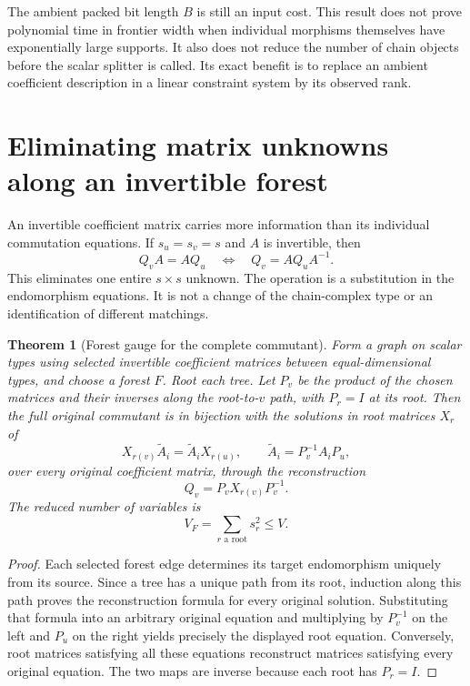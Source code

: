 \documentclass[11pt]{article}
\newtheorem{theorem}{Theorem}[section]
\theoremstyle{definition}
\begin{document}
The ambient packed bit length $B$ is still an input cost. This result
does not prove polynomial time in frontier width when individual
morphisms themselves have exponentially large supports. It also does
not reduce the number of chain objects before the scalar splitter is
called. Its exact benefit is to replace an ambient coefficient
description in a linear constraint system by its observed rank.

\section{Eliminating matrix unknowns along an invertible forest}
\label{sec:forest}

An invertible coefficient matrix carries more information than its
individual commutation equations. If $s_u=s_v=s$ and $A$ is invertible,
then
\[
                       Q_vA=AQ_u
       \quad\Longleftrightarrow\quad Q_v=AQ_uA^{-1}.
\]
This eliminates one entire $s\times s$ unknown. The operation is a
substitution in the endomorphism equations. It is not a change of
the chain-complex type or an identification of different matchings.

\begin{theorem}[Forest gauge for the complete commutant]
\label{thm:forest}
Form a graph on scalar types using selected invertible coefficient
matrices between equal-dimensional types, and choose a forest $F$.
Root each tree. Let $P_v$ be the product of the chosen matrices and
their inverses along the root-to-$v$ path, with $P_r=I$ at its root.
Then the full original commutant is in bijection with the solutions
in root matrices $X_r$ of
\[
                  X_{r(v)}\widetilde A_i
                       =\widetilde A_iX_{r(u)},
   \qquad \widetilde A_i=P_v^{-1}A_iP_u,
\]
over every original coefficient matrix, through the reconstruction
\[
                            Q_v=P_vX_{r(v)}P_v^{-1}.
\]
The reduced number of variables is
\[
                   V_F=\sum_{r\text{ a root}}s_r^2\le V.
\]
\end{theorem}

\begin{proof}
Each selected forest edge determines its target endomorphism
uniquely from its source. Since a tree has a unique path from its
root, induction along this path proves the reconstruction formula
for every original solution. Substituting that formula into an
arbitrary original equation and multiplying by $P_v^{-1}$ on the
left and $P_u$ on the right yields precisely the displayed root
equation. Conversely, root matrices satisfying all these equations
reconstruct matrices satisfying every original equation. The two
maps are inverse because each root has $P_r=I$.
\end{proof}
\end{document}
